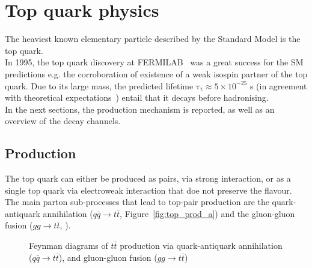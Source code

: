 \section{Top quark physics}
The heaviest known elementary particle described by the Standard Model is the top quark.\\
In 1995, the top quark discovery at FERMILAB~\cite{CDF,D0} was a great success for the SM predictions e.g. the corroboration of existence  of a weak isospin partner of the top quark.
Due to its large mass, the predicted lifetime $\mathrm{\tau_{t} \approx 5\times 10^{−25}}$ s (in agreement with theoretical expectations~\cite{LHcb_top}) entail that it decays before hadronising.\\
In the next sections, the production mechanism is reported, as well as an overview of the decay channels.
\subsection{Production}
The top quark can either be produced as pairs, via strong interaction, or as a single top quark via electroweak interaction that doe not preserve the flavour.\\
The main parton sub-processes that lead to top-pair production are the quark-antiquark annihilation ($q\bar{q}\rightarrow t\bar{t}$, Figure~\ref{fig:top_prod_a}) and the gluon-gluon fusion ($gg\rightarrow t\bar{t}$, ).\\
\begin{figure}[h]
	\centering
	\quad
	\quad
	\caption{Feynman diagrams of $t\bar{t}$ production via  quark-antiquark annihilation ($q\bar{q}\rightarrow t\bar{t}$),  and  gluon-gluon fusion ($gg\rightarrow t\bar{t}$) }
\end{figure}
